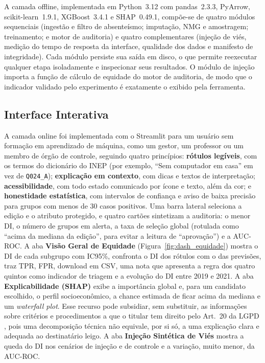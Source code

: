 A camada offline, implementada em Python~3.12 com pandas~2.3.3, PyArrow, scikit-learn~1.9.1, XGBoost~3.4.1 e SHAP~0.49.1, compõe-se de quatro módulos sequenciais (ingestão e filtro de absenteísmo; imputação, NMG e amostragem; treinamento; e motor de auditoria) e quatro complementares (injeção de viés, medição do tempo de resposta da interface, qualidade dos dados e manifesto de integridade). Cada módulo persiste sua saída em disco, o que permite reexecutar qualquer etapa isoladamente e inspecionar seus resultados. O módulo de injeção importa a função de cálculo de equidade do motor de auditoria, de modo que o indicador validado pelo experimento é exatamente o exibido pela ferramenta.

\subsection{Interface Interativa}
\label{sec:interface}

A camada online foi implementada com o Streamlit para um usuário sem formação em aprendizado de máquina, como um gestor, um professor ou um membro de órgão de controle, seguindo quatro princípios: \textbf{rótulos legíveis}, com os termos do dicionário do INEP (por exemplo, ``Sem computador em casa'' em vez de \texttt{Q024\_A}); \textbf{explicação em contexto}, com dicas e textos de interpretação; \textbf{acessibilidade}, com todo estado comunicado por ícone e texto, além da cor; e \textbf{honestidade estatística}, com intervalos de confiança e aviso de baixa precisão para grupos com menos de 30 casos positivos. Uma barra lateral seleciona a edição e o atributo protegido, e quatro cartões sintetizam a auditoria: o menor DI, o número de grupos em alerta, a taxa de seleção global (rotulada como ``acima da mediana da edição'', para evitar a leitura de ``aprovação'') e a AUC-ROC. A aba \textbf{Visão Geral de Equidade} (Figura~\ref{fig:dash_equidade}) mostra o DI de cada subgrupo com IC95\%, confronta o DI dos rótulos com o das previsões, traz TPR, FPR, download em CSV, uma nota que apresenta a regra dos quatro quintos como indicador de triagem e a evolução do DI entre 2019 e 2021. A aba \textbf{Explicabilidade (SHAP)} exibe a importância global e, para um candidato escolhido, o perfil socioeconômico, a chance estimada de ficar acima da mediana e um \textit{waterfall plot}. Esse recurso pode subsidiar, sem substituir, as informações sobre critérios e procedimentos a que o titular tem direito pelo Art.~20 da LGPD \cite{brasil2018lgpd}, pois uma decomposição técnica não equivale, por si só, a uma explicação clara e adequada ao destinatário leigo. A aba \textbf{Injeção Sintética de Viés} mostra a queda do DI nos cenários de injeção e de controle e a variação, muito menor, da AUC-ROC.

